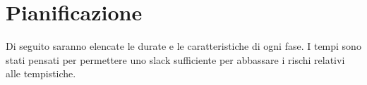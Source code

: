 \section{Pianificazione}
Di seguito saranno elencate le durate e le caratteristiche di ogni fase. I tempi sono stati pensati per permettere uno slack sufficiente per abbassare i rischi relativi alle tempistiche.
	
	
	
	
	
	
	
	
